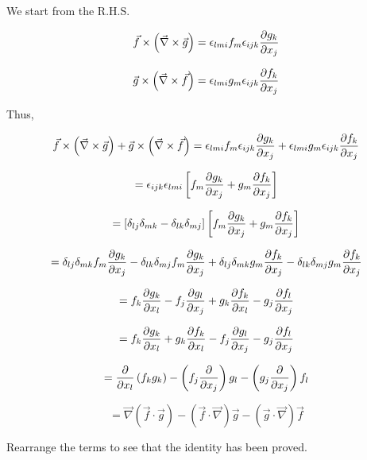 \begin{solution}[print]
We start from the R.H.S.

$$ \vec{f} \times \left( \vec{\nabla} \times \vec{g} \right) = \epsilon_{lmi} f_m \epsilon_{ijk} {\partial g_k \over \partial x_j} $$

$$ \vec{g} \times \left( \vec{\nabla} \times \vec{f} \right) = \epsilon_{lmi} g_m \epsilon_{ijk} {\partial f_k \over \partial x_j} $$

Thus,

$$ \vec{f} \times \left( \vec{\nabla} \times \vec{g} \right) + \vec{g} \times \left( \vec{\nabla} \times \vec{f} \right) = \epsilon_{lmi} f_m \epsilon_{ijk} {\partial g_k \over \partial x_j} + \epsilon_{lmi} g_m \epsilon_{ijk} {\partial f_k \over \partial x_j} $$

$$ = \epsilon_{ijk} \epsilon_{lmi} \left[ f_m {\partial g_k \over \partial x_j} + g_m {\partial f_k \over \partial x_j} \right]$$

$$ = \left[ \delta_{lj} \delta_{mk} - \delta_{lk} \delta_{mj} \right] \left[ f_m {\partial g_k \over \partial x_j} + g_m {\partial f_k \over \partial x_j} \right] $$

$$ = \delta_{lj} \delta_{mk} f_m {\partial g_k \over \partial x_j}  - \delta_{lk} \delta_{mj} f_m {\partial g_k \over \partial x_j} + \delta_{lj} \delta_{mk} g_m {\partial f_k \over \partial x_j} - \delta_{lk} \delta_{mj} g_m {\partial f_k \over \partial x_j} $$

$$ = f_k {\partial g_k \over \partial x_l} -  f_j {\partial g_l \over \partial x_j} + g_k {\partial f_k \over \partial x_l} - g_j {\partial f_l \over \partial x_j} $$

$$ = f_k {\partial g_k \over \partial x_l} +  g_k {\partial f_k \over \partial x_l} -  f_j {\partial g_l \over \partial x_j} - g_j {\partial f_l \over \partial x_j} $$

$$ = {\partial \over \partial x_l} \left( f_k g_k \right) - \left( f_j {\partial \over \partial x_j} \right) g_l - \left( g_j {\partial \over \partial x_j} \right) f_l $$

$$ = \vec{\nabla} \left( \vec{f} \cdot \vec{g} \right) - \left( \vec{f} \cdot \vec{\nabla} \right) \vec{g} - \left( \vec{g} \cdot \vec{\nabla} \right) \vec{f} $$

Rearrange the terms to see that the identity has been proved.

\end{solution}


